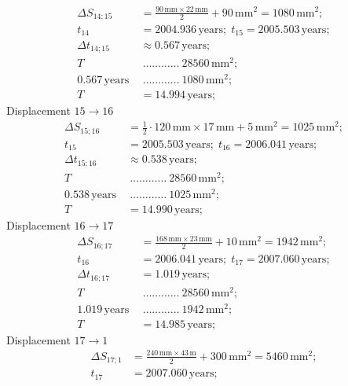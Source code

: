 \begin{description}
  \begin{align*}
    \Delta S_{14;15} &= \frac{90\,\mathrm{mm}\times22\,\mathrm{mm}}{2}
      + 90\,\mathrm{mm}^2 = 1080\,\mathrm{mm}^2;\\
    t_{14} &= 2004.936\,\mathrm{years};\; t_{15} = 2005.503\,\mathrm{years};\\
    \Delta t_{14;15} &\approx 0.567\,\mathrm{years};\\
    T\ &\ \dots\dots\dots\dots\ 28560\,\mathrm{mm}^2;\\
    0.567\,\mathrm{years}\ &\ \dots\dots\dots\dots\ 1080\,\mathrm{mm}^2;\\
    T &= 14.994\,\mathrm{years};
  \end{align*}
  Displacement $15 \rightarrow 16$
  \begin{align*}
    \Delta S_{15;16} &= \frac{1}{2}\cdot120\,\mathrm{mm}\times17\,\mathrm{mm}
      + 5\,\mathrm{mm}^2 = 1025\,\mathrm{mm}^2;\\
    t_{15} &= 2005.503\,\mathrm{years};\; t_{16} = 2006.041\,\mathrm{years};\\
    \Delta t_{15;16} &\approx 0.538\,\mathrm{years};\\
    T\ &\ \dots\dots\dots\dots\ 28560\,\mathrm{mm}^2;\\
    0.538\,\mathrm{years}\ &\ \dots\dots\dots\dots\ 1025\,\mathrm{mm}^2;\\
    T &= 14.990\,\mathrm{years};
  \end{align*}
  Displacement $16 \rightarrow 17$
  \begin{align*}
    \Delta S_{16;17} &= \frac{168\,\mathrm{mm}\times23\,\mathrm{mm}}{2}
      + 10\,\mathrm{mm}^2 = 1942\,\mathrm{mm}^2;\\
    t_{16} &= 2006.041\,\mathrm{years};\; t_{17} = 2007.060\,\mathrm{years};\\
    \Delta t_{16;17} &= 1.019\,\mathrm{years};\\
    T\ &\ \dots\dots\dots\dots\ 28560\,\mathrm{mm}^2;\\
    1.019\,\mathrm{years}\ &\ \dots\dots\dots\dots\ 1942\,\mathrm{mm}^2;\\
    T &= 14.985\,\mathrm{years};
  \end{align*}
  Displacement $17 \rightarrow 1$
  \begin{align*}
    \Delta S_{17;1} &= \frac{240\,\mathrm{mm}\times43\,\mathrm{m}}{2}
      + 300\,\mathrm{mm}^2 = 5460\,\mathrm{mm}^2;\\
    t_{17} &= 2007.060\,\mathrm{years};\\

\end{align*}
\end{description}
